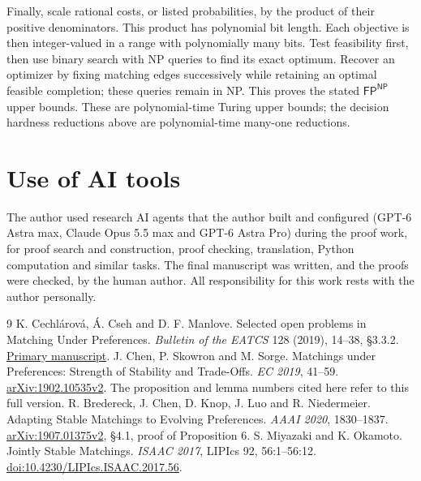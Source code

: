\documentclass[11pt]{article}
\newcommand{\NP}{\mathsf{NP}}
\newcommand{\FP}{\mathsf{FP}}
\begin{document}
Finally, scale rational costs, or listed probabilities, by the product
of their positive denominators. This product has polynomial bit length.
Each objective is then integer-valued in a range with polynomially many
bits. Test feasibility first, then use binary search with NP queries to
find its exact optimum. Recover an optimizer by fixing matching edges
successively while retaining an optimal feasible completion; these
queries remain in NP. This proves the stated $\FP^{\NP}$ upper bounds.
These are polynomial-time Turing upper bounds; the decision hardness
reductions above are polynomial-time many-one reductions.

\section*{Use of AI tools}
The author used research AI agents that the author built and configured (GPT-6 Astra max,
Claude Opus 5.5 max and GPT-6 Astra Pro) during the proof work, for proof search and
construction, proof checking, translation, Python computation and similar tasks. The final
manuscript was written, and the proofs were checked, by the human author. All responsibility
for this work rests with the author personally.

\begin{thebibliography}{9}
 K. Cechl\'arov\'a, \'A. Cseh and D. F. Manlove.
Selected open problems in Matching Under Preferences.
\emph{Bulletin of the EATCS} 128 (2019), 14--38, \S3.3.2.
\href{https://hpi.de/friedrich/docs/publications/2019/BEATCS.pdf}{Primary manuscript}.
 J. Chen, P. Skowron and M. Sorge.
Matchings under Preferences: Strength of Stability and Trade-Offs.
\emph{EC 2019}, 41--59.
\href{https://arxiv.org/pdf/1902.10535v2}{arXiv:1902.10535v2}.
The proposition and lemma numbers cited here refer to this full version.
 R. Bredereck, J. Chen, D. Knop, J. Luo and R. Niedermeier.
Adapting Stable Matchings to Evolving Preferences.
\emph{AAAI 2020}, 1830--1837.
\href{https://arxiv.org/pdf/1907.01375v2}{arXiv:1907.01375v2}, \S4.1,
proof of Proposition 6.
 S. Miyazaki and K. Okamoto.
Jointly Stable Matchings.
\emph{ISAAC 2017}, LIPIcs 92, 56:1--56:12.
\href{https://doi.org/10.4230/LIPIcs.ISAAC.2017.56}{doi:10.4230/LIPIcs.ISAAC.2017.56}.
\end{thebibliography}
\end{document}

